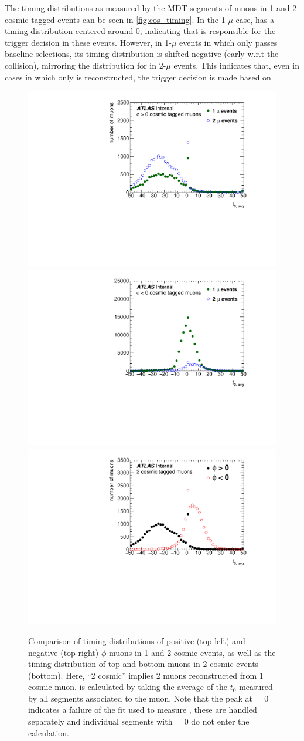 The timing distributions as measured by the MDT segments of muons in 1 and 2 cosmic tagged events can be seen in \autoref{fig:cos_timing}. In the 1 $\mu$ case, \mb has a timing distribution centered around 0, indicating that \mb is responsible for the trigger decision in these events. However, in 1-$\mu$ events in which only \mt passes baseline selections, its timing distribution is shifted negative (early w.r.t the collision), mirroring the distribution for \mt in 2-$\mu$ events. This indicates that, even in cases in which only \mt is reconstructed, the trigger decision is made based on \mb. 

\begin{figure}[htbp]
\centering
\includegraphics[width=.48\textwidth]{figures/cosmics/t0_plusphi.pdf}
\includegraphics[width=.48\textwidth]{figures/cosmics/t0_negphi.pdf}
\includegraphics[width=.48\textwidth]{figures/cosmics/t0_2cos_plusminus.pdf}
\caption{Comparison of timing distributions of positive (top left) and negative (top right) $\phi$ muons in 1 and 2 cosmic events, as well as the timing distribution of top and bottom muons in 2 cosmic events (bottom). Here, ``2 cosmic'' implies 2 muons reconstructed from 1 cosmic muon. \tavg is calculated by taking the average of the $t_{0}$ measured by all segments associated to the muon. Note that the peak at \tavg = 0 indicates a failure of the fit used to measure \tavg, these are handled separately and individual segments with \tavg = 0 do not enter the \tavg calculation.}
\label{fig:cos_timing}
\end{figure}

